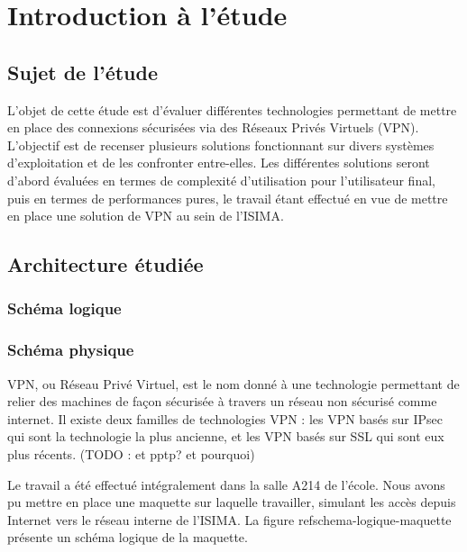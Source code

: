 \section{Introduction à l'étude}
\subsection{Sujet de l'étude}
L'objet de cette étude est d'évaluer différentes technologies permettant de mettre en place des connexions sécurisées via des Réseaux Privés Virtuels (VPN). L'objectif est de recenser plusieurs solutions fonctionnant sur divers systèmes d'exploitation et de les confronter entre-elles. Les différentes solutions seront d'abord évaluées en termes de complexité d'utilisation pour l'utilisateur final, puis en termes de performances pures, le travail étant effectué en vue de mettre en place une solution de VPN au sein de l'ISIMA.

\subsection{Architecture étudiée}
\subsubsection{Schéma logique}
\subsubsection{Schéma physique}


VPN, ou Réseau Privé Virtuel, est le nom donné à une technologie permettant de relier des machines de façon sécurisée à travers un réseau non sécurisé comme internet. Il existe deux familles de technologies VPN : les VPN basés sur IPsec qui sont la technologie la plus ancienne, et les VPN basés sur SSL qui sont eux plus récents. (TODO : et pptp? et pourquoi)

Le travail a été effectué intégralement dans la salle A214 de l'école. Nous avons pu mettre en place une maquette sur laquelle travailler, simulant les accès depuis Internet vers le réseau interne de l'ISIMA. La figure ref{schema-logique-maquette} présente un schéma logique de la maquette.

